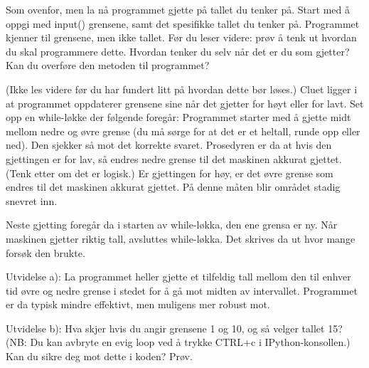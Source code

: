 %
%
Som ovenfor, men la nå programmet gjette på tallet du tenker på.
Start med å oppgi med input() grensene, samt det spesifikke tallet du tenker på.
Programmet kjenner til grensene, men ikke tallet.
Før du leser videre: prøv å tenk ut hvordan du skal programmere dette.
Hvordan tenker du selv når det er du som gjetter?
Kan du overføre den metoden til programmet?

(Ikke les videre før du har fundert litt på hvordan dette bør løses.)
Cluet ligger i at programmet oppdaterer grensene sine når det gjetter for høyt
eller for lavt.
Set opp en while-løkke der følgende foregår:
Programmet starter med å gjette midt mellom nedre og øvre grense
(du må sørge for at det er et heltall, runde opp eller ned).
Den sjekker så mot det korrekte svaret.
Prosedyren er da at hvis den gjettingen er for lav,
så endres nedre grense til det maskinen akkurat gjettet.
(Tenk etter om det er logisk.)
Er gjettingen for høy, er det øvre grense som endres til det maskinen akkurat gjettet.
På denne måten blir området stadig snevret inn.

Neste gjetting foregår da i starten av while-løkka, den ene grensa er ny.
Når maskinen gjetter riktig tall, avsluttes while-løkka.
Det skrives da ut hvor mange forsøk den brukte.

Utvidelse a): La programmet heller gjette et tilfeldig tall mellom den til enhver tid
øvre og nedre grense i stedet for å gå mot midten av intervallet.
Programmet er da typisk mindre effektivt, men muligens mer robust mot.

Utvidelse b): Hva skjer hvis du angir grensene 1 og 10, og så velger tallet 15?
(NB: Du kan avbryte en evig loop ved å trykke CTRL+c i IPython-konsollen.)
Kan du sikre deg mot dette i koden? Prøv.
